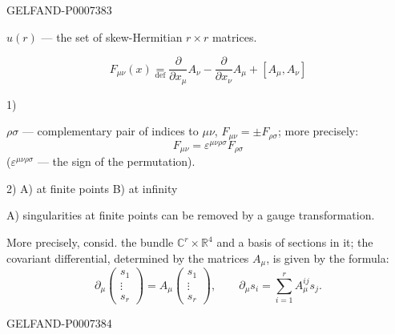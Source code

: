 \begin{GelfandAdjacentEvidence}{GELFAND-P000738}{3}

\(u(r)\) --- the set of skew-Hermitian \(r\times r\) matrices.

\begin{equation*}
\tag*{(1)\hfill}
F_{\mu\nu}(x)\underset{\mathrm{def}}{=}
\frac{\partial}{\partial x_\mu}A_\nu
-\frac{\partial}{\partial x_\nu}A_\mu+[A_\mu,A_\nu]
\end{equation*}

1) 

\(\rho\sigma\) --- complementary pair of indices to \(\mu\nu\), \quad \(F_{\mu\nu}=\pm F_{\rho\sigma}\); more precisely:
\begin{equation*}
\tag*{(2)\hfill}
F_{\mu\nu}=\varepsilon^{\mu\nu\rho\sigma}F_{\rho\sigma}
\end{equation*}
(\(\varepsilon^{\mu\nu\rho\sigma}\) --- the sign of the permutation).

2)  \quad A) at finite points \quad B) at infinity

A) singularities at finite points can be removed by a gauge transformation.

More precisely, consid. the bundle \(\mathbb C^r\times\mathbb R^4\) and a basis of sections in it;
the covariant differential, determined by the matrices \(A_\mu\), is given by the formula:
\begin{equation*}
\tag*{(3)\hfill}
\partial_\mu\begin{pmatrix}s_1\\ \vdots\\ s_r\end{pmatrix}
=A_\mu\begin{pmatrix}s_1\\ \vdots\\ s_r\end{pmatrix},
\qquad
\partial_\mu s_i=\sum_{i=1}^{r}A_\mu^{ij}s_j.
\end{equation*}
\end{GelfandAdjacentEvidence}
\begin{GelfandAdjacentEvidence}{GELFAND-P000738}{4}

\end{GelfandAdjacentEvidence}
